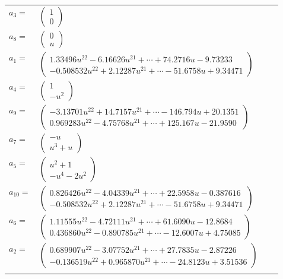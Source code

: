 \documentclass[1p]{elsarticle_modified}
\theoremstyle{definition}
\begin{document}
\begin{tabular}{m{7pt} m{180pt} m{7pt} m{180pt} }
\flushright $a_{3}=$&$\begin{pmatrix}1\\0\end{pmatrix}$ \\
\flushright $a_{8}=$&$\begin{pmatrix}0\\u\end{pmatrix}$ \\
\flushright $a_{1}=$&$\begin{pmatrix}1.33496 u^{22}-6.16626 u^{21}+\cdots+74.2716 u-9.73233\\-0.508532 u^{22}+2.12287 u^{21}+\cdots-51.6758 u+9.34471\end{pmatrix}$ \\
\flushright $a_{4}=$&$\begin{pmatrix}1\\- u^2\end{pmatrix}$ \\
\flushright $a_{9}=$&$\begin{pmatrix}-3.13701 u^{22}+14.7157 u^{21}+\cdots-146.794 u+20.1351\\0.969283 u^{22}-4.75768 u^{21}+\cdots+125.167 u-21.9590\end{pmatrix}$ \\
\flushright $a_{7}=$&$\begin{pmatrix}- u\\u^3+u\end{pmatrix}$ \\
\flushright $a_{5}=$&$\begin{pmatrix}u^2+1\\- u^4-2 u^2\end{pmatrix}$ \\
\flushright $a_{10}=$&$\begin{pmatrix}0.826426 u^{22}-4.04339 u^{21}+\cdots+22.5958 u-0.387616\\-0.508532 u^{22}+2.12287 u^{21}+\cdots-51.6758 u+9.34471\end{pmatrix}$ \\
\flushright $a_{6}=$&$\begin{pmatrix}1.11555 u^{22}-4.72111 u^{21}+\cdots+61.6090 u-12.8684\\0.436860 u^{22}-0.890785 u^{21}+\cdots-12.6007 u+4.75085\end{pmatrix}$ \\
\flushright $a_{2}=$&$\begin{pmatrix}0.689907 u^{22}-3.07752 u^{21}+\cdots+27.7835 u-2.87226\\-0.136519 u^{22}+0.965870 u^{21}+\cdots-24.8123 u+3.51536\end{pmatrix}$\\&\end{tabular}
\end{document}
